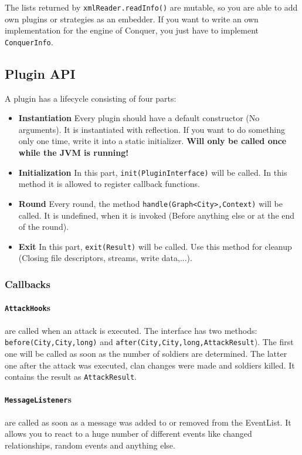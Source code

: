 \documentclass{article}
\begin{document}
The lists returned by \texttt{xmlReader.readInfo()} are mutable, so you are able to add own plugins or strategies as an embedder.\newline
If you want to write an own implementation for the engine of Conquer, you just have to implement \texttt{ConquerInfo}.

\subsection{Plugin API}
A plugin has a lifecycle consisting of four parts:
\begin{itemize}
	\item \textbf{Instantiation} Every plugin should have a default constructor (No arguments). It is instantiated with reflection. If you want to do something only one time, write it into a static initializer. \textbf{Will only be called once while the JVM is running!}
	\item \textbf{Initialization} In this part, \texttt{init(PluginInterface)} will be called. In this method it is allowed to register callback functions. 
	\item \textbf{Round} Every round, the method \texttt{handle(Graph<City>,Context)} will be called. It is undefined, when it is invoked (Before anything else or at the end of the round).
	\item \textbf{Exit} In this part, \texttt{exit(Result)} will be called. Use this method for cleanup (Closing file descriptors, streams, write data,...).
	
\end{itemize}
\subsubsection{Callbacks}
\paragraph{\texttt{AttackHook}s} are called when an attack is executed. The interface has two methods: \texttt{before(City,City,long)} and \texttt{after(City,City,long,AttackResult}). The first one will
be called as soon as the number of soldiers are determined. The latter one after the attack was executed, clan changes were made and soldiers killed. It contains the result as \texttt{AttackResult}.
\paragraph{\texttt{MessageListener}s} are called as soon as a message was added to or removed from the EventList. It allows you to react to a huge number of different events like changed relationships, random events and anything else.
\end{document}
